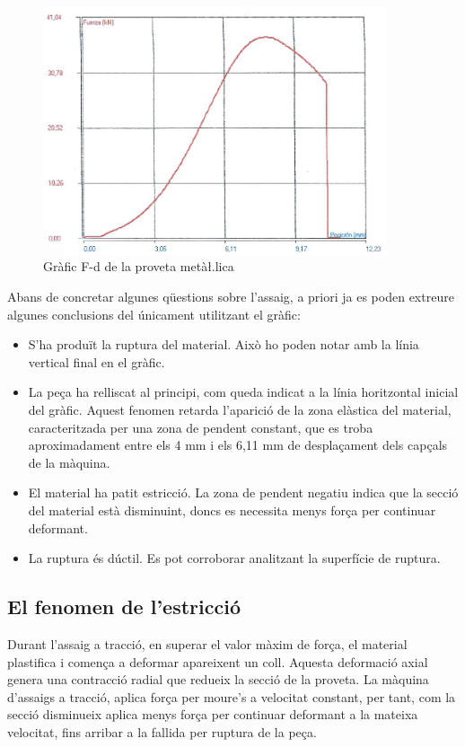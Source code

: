 \documentclass[a4paper]{report}
\begin{document}
\begin{figure}[hb]
    \centering
    \includegraphics[width=0.9\textwidth]{images/traccio/metalica-grafic-proveta}
    \caption{Gràfic F-d de la proveta metà\l.lica}
    \label{fig:traccio-metalica-grafic-proveta}
\end{figure}

Abans de concretar algunes qüestions sobre l’assaig, a priori ja es poden extreure algunes conclusions del únicament utilitzant el gràfic:
\begin{itemize}
    \item  S’ha produït la ruptura del material. Això ho poden notar amb la línia vertical final en el gràfic.
    \item  La peça ha relliscat al principi, com queda indicat a la línia horitzontal inicial del gràfic. Aquest fenomen retarda l’aparició de la zona elàstica del material, caracteritzada per una zona de pendent constant, que es troba aproximadament entre els 4 mm i els 6,11 mm de desplaçament dels capçals de la màquina.
    \item  El material ha patit estricció. La zona de pendent negatiu indica que la secció del material està disminuint, doncs es necessita menys força per continuar deformant.
    \item  La ruptura és dúctil. Es pot corroborar analitzant la superfície de ruptura.
\end{itemize}

\subsection{El fenomen de l'estricció}

Durant l’assaig a tracció, en superar el valor màxim de força, el material plastifica i comença a deformar apareixent un coll. Aquesta deformació axial genera una contracció radial que redueix la secció de la proveta. La màquina d’assaigs a tracció, aplica força per moure’s a velocitat constant, per tant, com la secció disminueix aplica menys força per continuar deformant a la mateixa velocitat, fins arribar a la fallida per ruptura de la peça.
\end{document}
